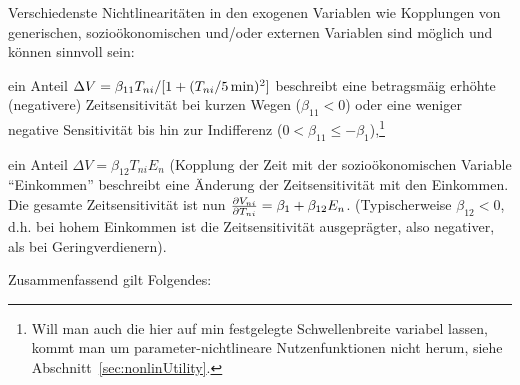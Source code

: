 \item Verschiedenste Nichtlinearit\"aten in den exogenen Variablen wie
  Kopplungen von generischen, sozio\"okonomischen und/oder externen
  Variablen sind m\"oglich und
  k\"onnen sinnvoll sein:
\bi
\item ein Anteil $\Delta V=\beta_{11} T_{ni}/[1+(T_{ni}/\unit[5]{min})^2]$
  beschreibt eine betragsm\"a\3ig erh\"ohte (negativere) 
Zeitsensitivit\"at bei kurzen Wegen
  ($\beta_{11}<0$) oder eine weniger negative  Sensitivit\"at bis hin zur
  Indifferenz ($0 < \beta_{11} \le -\beta_1$),\footnote{Will man auch
    die hier auf \unit[5]{min} festgelegte Schwellenbreite variabel
    lassen, kommt man um parameter-nichtlineare Nutzenfunktionen nicht
    herum, siehe Abschnitt~\ref{sec:nonlinUtility}.}
\item ein Anteil $\Delta V=\beta_{12} T_{ni}E_n$ (Kopplung der
  Zeit mit der sozio\-\"okonomischen Variable
  ``Einkommen'' beschreibt eine \"Anderung der Zeitsensitivit\"at
  mit den Einkommen. Die gesamte  Zeitsensitivit\"at ist
  nun
  $\frac{\partial V_{ni}}{\partial T_{ni}}=\beta_1+\beta_{12}E_n$. (Typischerweise
  $\beta_{12}<0$, d.h. bei hohem 
  Einkommen ist die Zeitsensitivit\"at ausgepr\"agter, also
  negativer, als bei Geringverdienern). 
\ei

\ei

Zusammenfassend gilt Folgendes:




